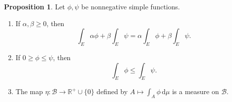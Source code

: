 \documentclass[12pt]{article}
\newcommand{\R}{\mathbb{R}}
\newcommand{\B}{\mathcal{B}}
\newcommand{\dif}{\, \mathrm{d}}
\theoremstyle{definition}
\newtheorem*{prop}{Proposition}
\begin{document}
\begin{prop}

  Let \( \phi, \psi \) be nonnegative simple functions. 
    \begin{enumerate}[label = (\alph{*})]
      \item If \( \alpha, \beta  \geq 0 \), then 
        \[
             \int_{E} \alpha \phi + \beta \int_{E} \psi = \alpha \int_{E} \phi + \beta \int_{E} \psi.
        \]
      \item If \( 0 \geq \phi \leq \psi \), then 
          \[
              \int_{E} \phi \leq \int_{E} \psi.
          \]
      \item The map \( \eta: \B \to \R^+ \cup \{ 0 \} \) defined by \( \displaystyle A \mapsto \int_{A} \phi \dif \mu \) is a measure on \( \B \).
    \end{enumerate}
  
\end{prop}
\end{document}
